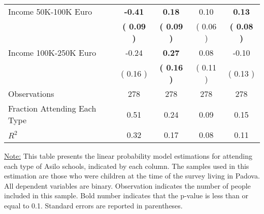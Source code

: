 \begin{table}[H]
{\begin{tabular}{lcccc}
\quad Income 50K-100K Euro & \textbf{    -0.41} & \textbf{     0.18} &      0.10 & \textbf{     0.13} \\
\quad  & \textbf{(     0.09 )} & \textbf{(     0.09 )}  & (     0.06 )  & \textbf{(     0.08 )}  \\
\quad Income 100K-250K Euro &     -0.24 & \textbf{     0.27} &      0.08 &     -0.10 \\
\quad  & (     0.16 ) & \textbf{(     0.16 )}  & (     0.11 )  & (     0.13 )  \\
\midrule
Observations & 278 & 278 & 278 & 278 \\
Fraction Attending Each Type &      0.51 &      0.24 &      0.09 &      0.15 \\
\midrule
$ R^2$ &      0.32 &      0.17 &      0.08 &      0.11 \\
\bottomrule
\end{tabular}}
\end{table}
\begin{scriptsize}
\noindent\underline{Note:} This table presents the linear probability model estimations for attending each type of Asilo schools, indicated by each column. The samples used in this estimation are those who were children at the time of the survey living in Padova. All dependent variables are binary. Observation indicates the number of people included in this sample. Bold number indicates that the p-value is less than or equal to 0.1. Standard errors are reported in parentheses.
\end{scriptsize}
